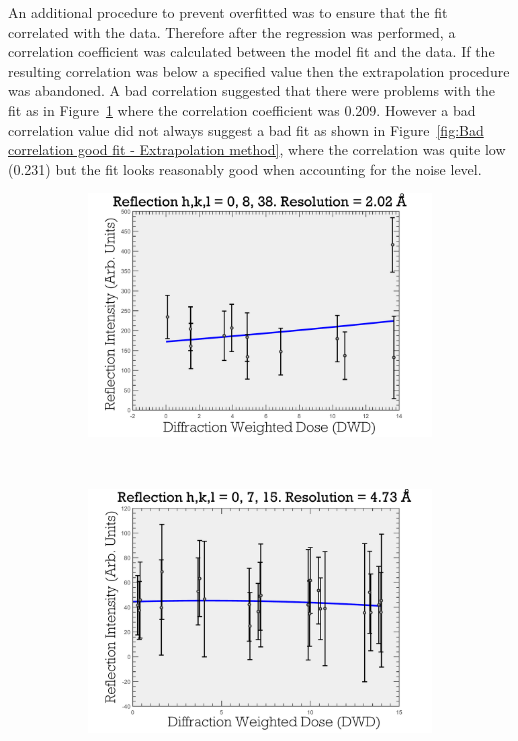 An additional procedure to prevent overfitted was to ensure that the fit correlated with the data.
Therefore after the regression was performed, a correlation coefficient was calculated between the model fit and the data.
If the resulting correlation was below a specified value then the extrapolation procedure was abandoned.
A bad correlation suggested that there were problems with the fit as in Figure~\ref{fig:Bad correlation bad fit - Extrapolation method} where the correlation coefficient was 0.209.
However a bad correlation value did not always suggest a bad fit as shown in Figure~\ref{fig:Bad correlation good fit - Extrapolation method}, where the correlation was  quite low (0.231) but the fit looks reasonably good when accounting for the noise level.
\begin{figure}
        \centering
        \begin{subfigure}[b]{1\textwidth}
                \centering
                \includegraphics[width=\textwidth]{figures/zde/ReflectionPlot_h,k,l_0,8,38-bad_corr_bad_fit.pdf}
                \caption{}
                \label{fig:Bad correlation bad fit - Extrapolation method}
        \end{subfigure}
				\\
        \begin{subfigure}[b]{1\textwidth}
                \centering
                \includegraphics[width=\textwidth]{figures/zde/ReflectionPlot_h,k,l_0,7,15-bad_corr_good_fit.pdf}

\end{subfigure}
\end{figure}
